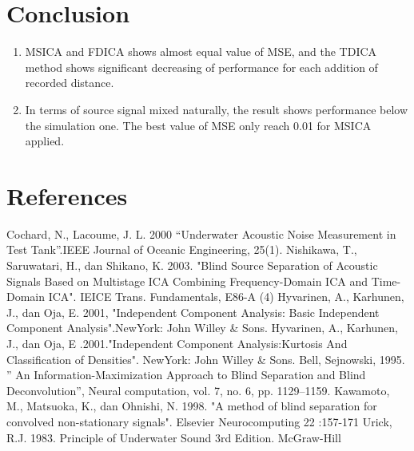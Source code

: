 \documentclass[a4paper]{jpconf}
\begin{document}
\section{Conclusion}
\renewcommand{\theenumi}{\arabic{enumi}}
\begin{enumerate}
	\item MSICA and FDICA shows almost equal value of MSE, and the TDICA method shows significant decreasing of performance for each addition of recorded distance.
	\item In terms of source signal mixed naturally, the result shows performance below the simulation one. The best value of MSE only reach 0.01 for MSICA applied.
\end{enumerate}

\section*{References}
\begin{thebibliography}{9}
 Cochard, N., Lacoume, J. L. 2000 “Underwater Acoustic Noise Measurement in Test Tank”.IEEE Journal of Oceanic Engineering, 25(1).
 Nishikawa, T., Saruwatari, H., dan Shikano, K. 2003. "Blind Source Separation of Acoustic Signals Based on Multistage ICA Combining Frequency-Domain ICA and Time-Domain ICA". IEICE Trans. Fundamentals, E86-A (4)
 Hyvarinen, A., Karhunen, J., dan Oja, E. 2001, "Independent Component Analysis: Basic Independent Component Analysis".NewYork: John Willey \& Sons.
 Hyvarinen, A., Karhunen, J., dan Oja, E .2001."Independent Component Analysis:Kurtosis And Classification of Densities". NewYork: John Willey \& Sons.
 Bell, Sejnowski, 1995. ” An Information-Maximization Approach to Blind Separation and Blind Deconvolution”, Neural computation, vol. 7, no. 6, pp. 1129–1159.
 Kawamoto, M., Matsuoka, K., dan Ohnishi, N. 1998. "A method of blind separation for convolved non-stationary signals". Elsevier Neurocomputing 22 :157-171
 Urick, R.J. 1983. Principle of Underwater Sound 3rd Edition. McGraw-Hill 
\end{thebibliography}
\end{document}
